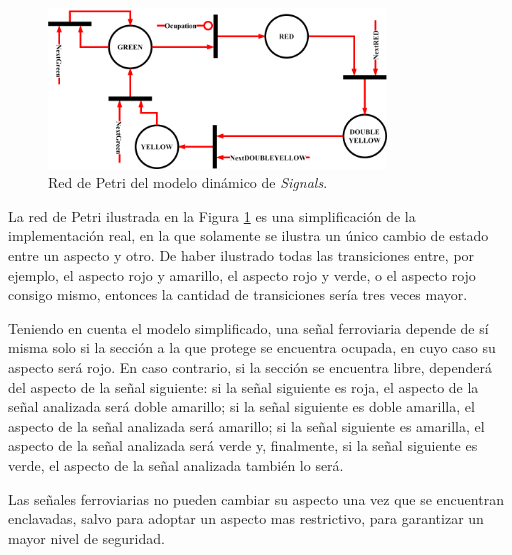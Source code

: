 	\begin{figure}[H]
		\centering
		\includegraphics[width=0.8\textwidth]{Figuras/SIG_petri}
		\centering\caption{Red de Petri del modelo dinámico de \textit{Signals}.}
		\label{fig:SIG_Petri}
	\end{figure}
	
	La red de Petri ilustrada en la Figura \ref{fig:SIG_Petri} es una simplificación de la implementación real, en la que solamente se ilustra un único cambio de estado entre un aspecto y otro. De haber ilustrado todas las transiciones entre, por ejemplo, el aspecto rojo y amarillo, el aspecto rojo y verde, o el aspecto rojo consigo mismo, entonces la cantidad de transiciones sería tres veces mayor.
	
	Teniendo en cuenta el modelo simplificado, una señal ferroviaria depende de sí misma solo si la sección a la que protege se encuentra ocupada, en cuyo caso su aspecto será rojo. En caso contrario, si la sección se encuentra libre, dependerá del aspecto de la señal siguiente: si la señal siguiente es roja, el aspecto de la señal analizada será doble amarillo; si la señal siguiente es doble amarilla, el aspecto de la señal analizada será amarillo; si la señal siguiente es amarilla, el aspecto de la señal analizada será verde y, finalmente, si la señal siguiente es verde, el aspecto de la señal analizada también lo será.
	
	Las señales ferroviarias no pueden cambiar su aspecto una vez que se encuentran enclavadas, salvo para adoptar un aspecto mas restrictivo, para garantizar un mayor nivel de seguridad.